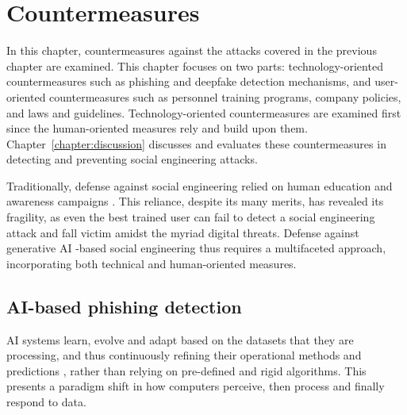 


\chapter{Countermeasures\label{chapter:countermeasures}}

\begin{comment}
    - 
\end{comment}

In this chapter, countermeasures against the attacks covered in the previous chapter are examined. This chapter focuses on two parts: technology-oriented countermeasures such as phishing and deepfake detection mechanisms, and user-oriented countermeasures such as personnel training programs, company policies, and laws and guidelines. Technology-oriented countermeasures are examined first since the human-oriented measures rely and build upon them. Chapter~\ref{chapter:discussion} discusses and evaluates these countermeasures in detecting and preventing social engineering attacks.

Traditionally, defense against social engineering relied on human education and awareness campaigns \citep{fakhouri_AI_Driven_Solutions_SE_Attacks_2024}. This reliance, despite its many merits, has revealed its fragility, as even the best trained user can fail to detect a social engineering attack and fall victim amidst the myriad digital threats. Defense against generative AI -based social engineering thus requires a multifaceted approach, incorporating both technical and human-oriented measures.









\section{AI-based phishing detection}
\begin{comment}

AI-generated content detection

What to cover:
    - Deepfake content detection
    - Spear phishing detection

    
\end{comment}



AI systems learn, evolve and adapt based on the datasets that they are processing, and thus continuously refining their operational methods and predictions \citep{fakhouri_AI_Driven_Solutions_SE_Attacks_2024}, rather than relying on pre-defined and rigid algorithms. This presents a paradigm shift in how computers perceive, then process and finally respond to data. 

